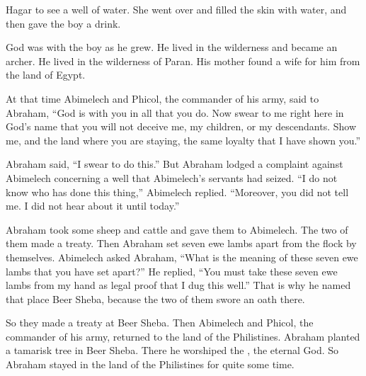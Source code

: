 {Hagar to see
a well
of water.
She went
over and filled
the skin
with water,
and then gave the boy
a drink.
\par }{\PP {}God
was
with
the boy
as he grew.
He lived
in the wilderness
and became
an archer.
He lived
in the wilderness
of Paran.
His mother
found a wife
for him from the land
of Egypt.
\par }{\PP {}At that time
Abimelech
and Phicol,
the commander
of his army,
said
to
Abraham,
“God
is with
you in all
that
you
do.
Now
swear
to me right here
in God’s
name that you will not deceive
me, my
children,
or my
descendants.
Show me,
and the land
where
you are staying,
the same loyalty
that
I have
shown you.”
\par }{\PP {}Abraham
said,
“I
swear to do this.”
But Abraham
lodged a complaint
against
Abimelech
concerning
a well
that
Abimelech’s
servants
had seized.
“I do not
know
who
has done
this
thing,”
Abimelech
replied.
“Moreover,
you
did not
tell
me. I
did not
hear
about it until
today.”
\par }{\PP {}Abraham
took
some sheep
and cattle
and gave
them to Abimelech.
The two
of them made
a treaty.
Then Abraham
set
seven
ewe
lambs apart from the flock
by themselves.
Abimelech
asked
Abraham,
“What
is the meaning of
these
seven
ewe
lambs that
you have set
apart?”
He replied,
“You must
take
these seven
ewe
lambs from my hand
as legal proof
that
I dug
this
well.”
That is why
he named
that place
Beer Sheba,
because
the two
of them swore
an oath there.
\par }{\PP {}So they made
a treaty
at Beer Sheba.
Then
Abimelech
and Phicol,
the commander
of his army,
returned
to
the land
of the Philistines.
Abraham planted
a tamarisk tree
in Beer Sheba.
There
he worshiped
the {}, the eternal
God.
So Abraham
stayed
in the land
of the Philistines
for quite
some time.

}
